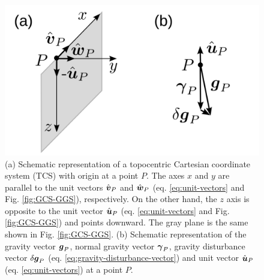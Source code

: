 \documentclass[extra]{gji}
\begin{document}
\begin{figure}
    \includegraphics{figures/local-system.png}
    \caption{(a) Schematic representation of a topocentric Cartesian 
    coordinate system (TCS) with origin at a point $P$. The axes $x$
    and $y$ are parallel to the unit vectors $\hat{\mitbf{v}}_{P}$
    and $\hat{\mitbf{w}}_{P}$ (eq. \ref{eq:unit-vectors} and
    Fig. \ref{fig:GCS-GGS}), respectively. On the other hand, the $z$ axis is opposite to the unit vector $\hat{\mitbf{u}}_{P}$ (eq. 
    \ref{eq:unit-vectors} and Fig. \ref{fig:GCS-GGS}) and points downward. The gray plane is the same shown in Fig. \ref{fig:GCS-GGS}.
    (b) Schematic representation of the gravity vector
    $\mitbf{g}_{P}$, normal gravity vector $\mitbf{\gamma}_{P}$,
    gravity disturbance vector $\delta \mitbf{g}_{P}$
    (eq. \ref{eq:gravity-disturbance-vector}) and unit vector 
    $\hat{\mitbf{u}}_{P}$ (eq. \ref{eq:unit-vectors}) at a point 
    $P$.}
  \label{fig:TCS}
\end{figure}
\end{document}
